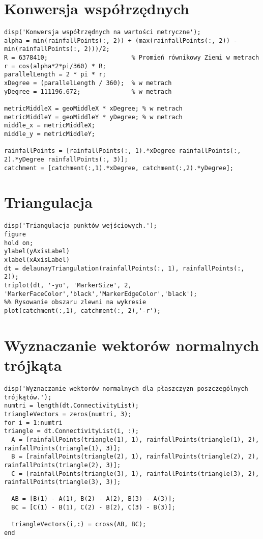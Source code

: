 \section{Konwersja współrzędnych}
\begin{lstlisting}
disp('Konwersja współrzędnych na wartości metryczne');
alpha = min(rainfallPoints(:, 2)) + (max(rainfallPoints(:, 2)) - min(rainfallPoints(:, 2)))/2;
R = 6378410;                       % Promień równikowy Ziemi w metrach
r = cos(alpha*2*pi/360) * R;
parallelLength = 2 * pi * r;
xDegree = (parallelLength / 360);  % w metrach
yDegree = 111196.672;              % w metrach

metricMiddleX = geoMiddleX * xDegree; % w metrach
metricMiddleY = geoMiddleY * yDegree; % w metrach
middle_x = metricMiddleX;
middle_y = metricMiddleY;

rainfallPoints = [rainfallPoints(:, 1).*xDegree rainfallPoints(:, 2).*yDegree rainfallPoints(:, 3)];
catchment = [catchment(:,1).*xDegree, catchment(:,2).*yDegree];
\end{lstlisting}


\section{Triangulacja}
\begin{lstlisting}
disp('Triangulacja punktów wejściowych.');
figure
hold on;
ylabel(yAxisLabel)
xlabel(xAxisLabel)
dt = delaunayTriangulation(rainfallPoints(:, 1), rainfallPoints(:, 2));
triplot(dt, '-yo', 'MarkerSize', 2, 'MarkerFaceColor','black','MarkerEdgeColor','black');
%% Rysowanie obszaru zlewni na wykresie
plot(catchment(:,1), catchment(:, 2),'-r');
\end{lstlisting}




\section{Wyznaczanie wektorów normalnych trójkąta}
\begin{lstlisting}
disp('Wyznaczanie wektorów normalnych dla płaszczyzn poszczególnych trójkątów.');
numtri = length(dt.ConnectivityList);
triangleVectors = zeros(numtri, 3);
for i = 1:numtri
triangle = dt.ConnectivityList(i, :);
  A = [rainfallPoints(triangle(1), 1), rainfallPoints(triangle(1), 2), rainfallPoints(triangle(1), 3)];
  B = [rainfallPoints(triangle(2), 1), rainfallPoints(triangle(2), 2), rainfallPoints(triangle(2), 3)];
  C = [rainfallPoints(triangle(3), 1), rainfallPoints(triangle(3), 2), rainfallPoints(triangle(3), 3)];

  AB = [B(1) - A(1), B(2) - A(2), B(3) - A(3)];
  BC = [C(1) - B(1), C(2) - B(2), C(3) - B(3)];
    
  triangleVectors(i,:) = cross(AB, BC);
end
\end{lstlisting}



